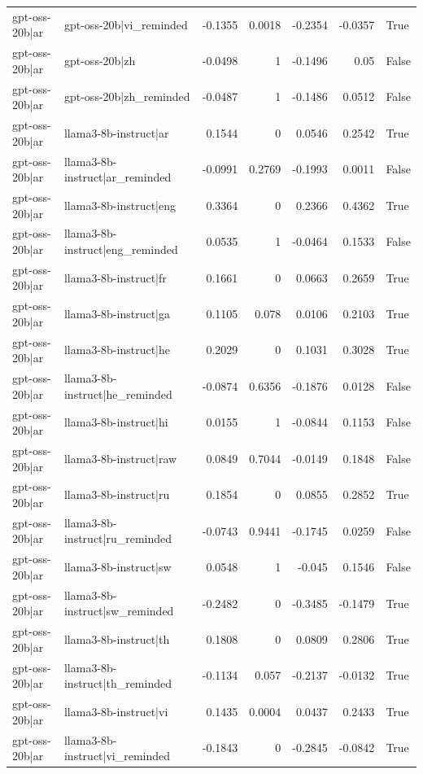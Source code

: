 \begin{table}
\begin{tabular}{l l r r r r l}
gpt-oss-20b|ar & gpt-oss-20b|vi_reminded & -0.1355 & 0.0018 & -0.2354 & -0.0357 & True \\
gpt-oss-20b|ar & gpt-oss-20b|zh & -0.0498 & 1 & -0.1496 & 0.05 & False \\
gpt-oss-20b|ar & gpt-oss-20b|zh_reminded & -0.0487 & 1 & -0.1486 & 0.0512 & False \\
gpt-oss-20b|ar & llama3-8b-instruct|ar & 0.1544 & 0 & 0.0546 & 0.2542 & True \\
gpt-oss-20b|ar & llama3-8b-instruct|ar_reminded & -0.0991 & 0.2769 & -0.1993 & 0.0011 & False \\
gpt-oss-20b|ar & llama3-8b-instruct|eng & 0.3364 & 0 & 0.2366 & 0.4362 & True \\
gpt-oss-20b|ar & llama3-8b-instruct|eng_reminded & 0.0535 & 1 & -0.0464 & 0.1533 & False \\
gpt-oss-20b|ar & llama3-8b-instruct|fr & 0.1661 & 0 & 0.0663 & 0.2659 & True \\
gpt-oss-20b|ar & llama3-8b-instruct|ga & 0.1105 & 0.078 & 0.0106 & 0.2103 & True \\
gpt-oss-20b|ar & llama3-8b-instruct|he & 0.2029 & 0 & 0.1031 & 0.3028 & True \\
gpt-oss-20b|ar & llama3-8b-instruct|he_reminded & -0.0874 & 0.6356 & -0.1876 & 0.0128 & False \\
gpt-oss-20b|ar & llama3-8b-instruct|hi & 0.0155 & 1 & -0.0844 & 0.1153 & False \\
gpt-oss-20b|ar & llama3-8b-instruct|raw & 0.0849 & 0.7044 & -0.0149 & 0.1848 & False \\
gpt-oss-20b|ar & llama3-8b-instruct|ru & 0.1854 & 0 & 0.0855 & 0.2852 & True \\
gpt-oss-20b|ar & llama3-8b-instruct|ru_reminded & -0.0743 & 0.9441 & -0.1745 & 0.0259 & False \\
gpt-oss-20b|ar & llama3-8b-instruct|sw & 0.0548 & 1 & -0.045 & 0.1546 & False \\
gpt-oss-20b|ar & llama3-8b-instruct|sw_reminded & -0.2482 & 0 & -0.3485 & -0.1479 & True \\
gpt-oss-20b|ar & llama3-8b-instruct|th & 0.1808 & 0 & 0.0809 & 0.2806 & True \\
gpt-oss-20b|ar & llama3-8b-instruct|th_reminded & -0.1134 & 0.057 & -0.2137 & -0.0132 & True \\
gpt-oss-20b|ar & llama3-8b-instruct|vi & 0.1435 & 0.0004 & 0.0437 & 0.2433 & True \\
gpt-oss-20b|ar & llama3-8b-instruct|vi_reminded & -0.1843 & 0 & -0.2845 & -0.0842 & True \\

\end{tabular}
\end{table}

